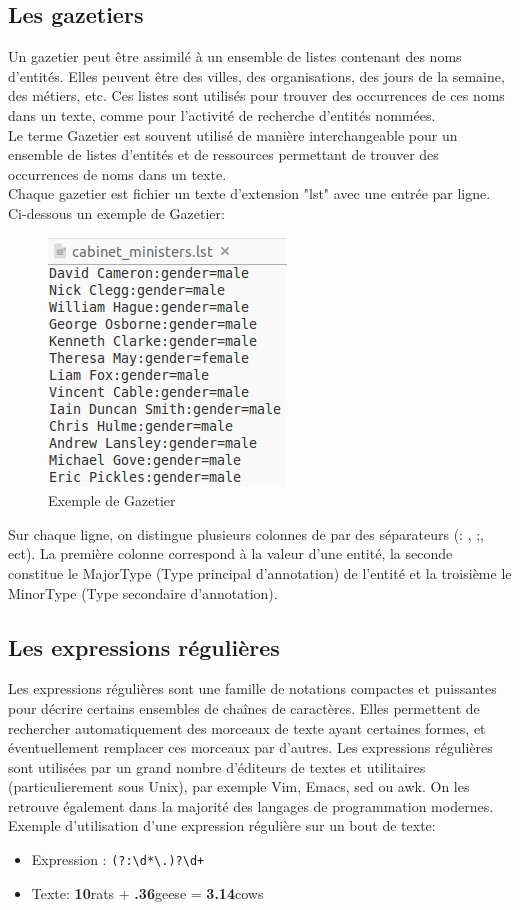 \documentclass[a4paper, 11pt]{report}
\begin{document}
\subsection{Les gazetiers}
Un gazetier peut être assimilé à un ensemble de listes contenant des noms d'entités. Elles peuvent être des villes, des organisations, des jours de la semaine, des métiers, etc. Ces listes sont utilisés pour trouver des occurrences de ces noms dans un texte, comme pour l'activité de recherche d'entités nommées.\\
Le terme Gazetier est souvent utilisé de manière interchangeable pour un ensemble de listes d'entités et de ressources permettant de trouver des occurrences de noms dans un texte.\\
Chaque gazetier est fichier un texte d'extension "lst" avec une entrée par ligne.
Ci-dessous un exemple de Gazetier:
\begin{figure}[H]
\begin{center}
\includegraphics[scale=0.5]{img/exGazetier.png}
\end{center}
\caption{Exemple de Gazetier}
\end{figure}
Sur chaque ligne, on distingue plusieurs colonnes de par des séparateurs (: , ;, ect). La première colonne correspond à la valeur d'une entité, la seconde constitue le MajorType (Type principal d'annotation) de l'entité et la troisième le MinorType (Type secondaire d'annotation).
\subsection{Les expressions régulières}
Les expressions régulières sont une famille de notations compactes et puissantes pour décrire certains ensembles de chaînes de caractères. Elles permettent de rechercher automatiquement des morceaux de texte ayant certaines formes, et éventuellement remplacer ces morceaux par d'autres.
Les expressions régulières sont utilisées par un grand nombre d'éditeurs de textes et utilitaires (particulierement sous Unix), par exemple Vim, Emacs, sed ou awk. On les retrouve également dans la majorité des langages de programmation modernes.\\
Exemple d'utilisation d'une expression régulière sur un bout de texte:
\begin{itemize}
\item Expression : \verb|(?:\d*\.)?\d+|
\item Texte: \textbf{10}rats + \textbf{.36}geese = \textbf{3.14}cows
\end{itemize}
\end{document}
